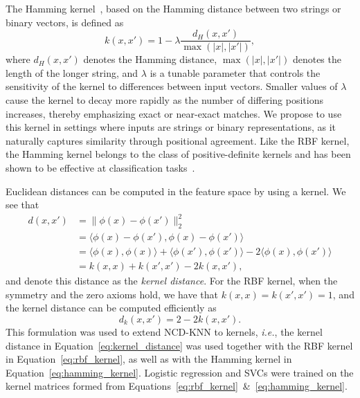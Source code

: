 \documentclass[preprint,12pt]{article}
\begin{document}
The Hamming kernel~\cite{hamming_kernel}, based on the Hamming distance between two strings or binary vectors, is defined as
\begin{equation}
    k(x, x') = 1 - \lambda \frac{d_H(x,x')}{\max(|x|,|x'|)},
    \label{eq:hamming_kernel}
\end{equation}
where $ d_H(x, x') $ denotes the Hamming distance, $\max(|x|,|x'|)$ denotes the length of the longer string, and $ \lambda $ is a tunable parameter that controls the sensitivity of the kernel to differences between input vectors.
Smaller values of $ \lambda $ cause the kernel to decay more rapidly as the number of differing positions increases, thereby emphasizing exact or near-exact matches.
We propose to use this kernel in settings where inputs are strings or binary representations, as it naturally captures similarity through positional agreement.
Like the RBF kernel, the Hamming kernel belongs to the class of positive-definite kernels and has been shown to be effective at classification tasks~\cite{hamming_classification}.


Euclidean distances can be computed in the feature space by using a kernel. We see that
\begin{align*}
    d(x,x')
        &= \| \phi(x) - \phi(x') \|_2^2 \\
        &= \langle\phi(x) - \phi(x'), \phi(x) - \phi(x') \rangle \\
        &= \langle \phi(x), \phi(x) \rangle + \langle \phi(x'), \phi(x') \rangle - 2\langle \phi(x), \phi(x') \rangle \\
        &= k(x, x) + k(x', x') - 2k(x, x'),
\end{align*}
and denote this distance as the \textit{kernel distance}.
For the RBF kernel, when the symmetry and the zero axioms hold, we have that $k(x,x) = k(x',x') = 1$, and the kernel distance can be computed efficiently as
\begin{equation}
    d_k(x, x') = 2 - 2 k(x, x').
    \label{eq:kernel_distance}
\end{equation}
This formulation was used to extend NCD-KNN to kernels, \textit{i.e.}, the kernel distance in Equation~\ref{eq:kernel_distance} was used together with the RBF kernel in Equation~\ref{eq:rbf_kernel}, as well as with the Hamming kernel in Equation~\ref{eq:hamming_kernel}.
Logistic regression and SVCs were trained on the kernel matrices formed from Equations~\ref{eq:rbf_kernel}~\&~\ref{eq:hamming_kernel}.
\end{document}
